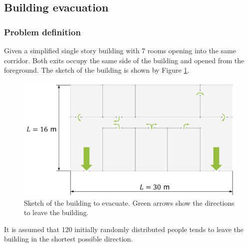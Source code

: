 \documentclass[a4paper,12pt,openany]{book}
\theoremstyle{break}
\begin{document}
\subsection{Building evacuation} \label{sec:SFM_example}
\subsubsection{Problem definition}
Given a simplified single story building with 7 rooms opening into the same corridor. Both exits occupy the same side of the building and opened from the foreground. The sketch of the building is shown by Figure \ref{fig:building_sketch}.
\begin{figure}[H]
  \includegraphics[scale=0.5]{building_sketch.pdf}
  \centering
  \caption{Sketch of the building to evacuate. Green arrows show the directions to leave the building.}
  \label{fig:building_sketch}
\end{figure}\vspace*{3pt}
It is assumed that 120 initially randomly distributed people tends to leave the building in the shortest possible direction.
\end{document}
